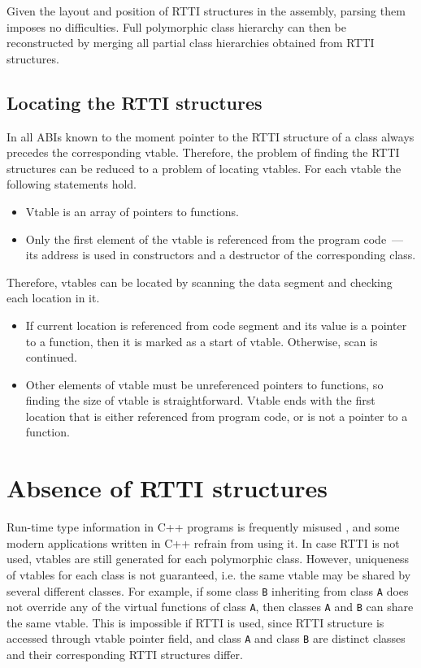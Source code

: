 \documentclass[10pt, conference]{IEEEtran}
\newcommand{\compact}{}
\begin{document}
Given the layout and position of RTTI structures in the assembly,
parsing them imposes no difficulties.
Full polymorphic class hierarchy
can then be reconstructed by merging all partial class hierarchies
obtained from RTTI structures.



\quad

\subsection{Locating the RTTI structures}
\label{chapterLocatingRTTI}
In all ABIs known to the moment pointer to the RTTI structure
of a class always precedes the corresponding vtable.
Therefore, the problem of finding the RTTI structures can be reduced
to a problem of locating vtables.
For each vtable the following statements hold.
\begin{itemize}\compact
\item Vtable is an array of pointers to functions.
\item Only the first element of the vtable
    is referenced from the program code~--- its address
    is used in constructors and a destructor of the corresponding class.
\end{itemize}

Therefore, vtables can be located by scanning the data segment and
checking each location in it.
\begin{itemize}\compact
\item If current location is referenced from code segment and
    its value is a pointer to a function, then it is marked as
    a start of vtable. Otherwise, scan is continued.
\item Other elements of vtable must be unreferenced
    pointers to functions, so finding the size of vtable is
    straightforward. Vtable ends with the first 
    location that is either referenced from program code,
    or is not a pointer to a function.
\end{itemize}





\quad

\section{Absence of RTTI structures}
\label{sectionNoRTTIAnalysis}

Run-time type information in C++ programs
is frequently misused \cite{stroustrup93},
and some modern applications written in C++ refrain from using it.
In case RTTI is not used, vtables are still generated for each polymorphic class.
However, uniqueness of vtables for each class
is not guaranteed, i.e. the same vtable
may be shared by several different classes.
For example, if some class \lstinline{B} inheriting from class \lstinline{A}
does not override any of the virtual functions of class \lstinline{A}, then classes \lstinline{A}
and \lstinline{B} can share the same vtable. This is impossible if RTTI
is used, since RTTI structure is accessed through vtable pointer field,
and class \lstinline{A} and class \lstinline{B} are distinct classes and their corresponding
RTTI structures differ.
\end{document}
